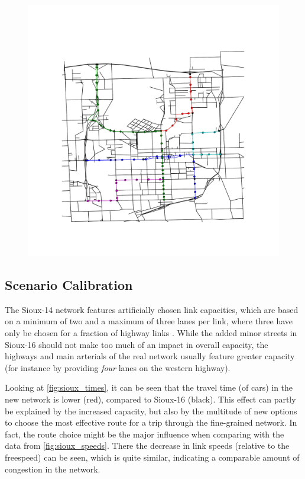 \begin{figure}
    \centering
    \includegraphics[width=1.0\textwidth]{figures/pt_network.pdf}
    \caption{}
    \label{fig:pt_network}
\end{figure}

\subsection{Scenario Calibration}

The Sioux-14 network features artificially chosen link capacities, which are based
on a minimum of two and a maximum of three lanes per link, where three have only
be chosen for a fraction of highway links \citep{Chakirov2014}. While the added
minor streets in Sioux-16 should not make too much of an impact in overall
capacity, the highways and main arterials of the real network usually feature
greater capacity (for instance by providing \textit{four} lanes on the western highway).

Looking at \cref{fig:sioux_times}, it can be seen that the travel time (of cars) in
the new network is lower (red), compared to Sioux-16 (black). This effect can partly
be explained by the increased capacity, but also by the multitude of new options
to choose the most effective route for a trip through the fine-grained network. In
fact, the route choice might be the major influence when comparing with the data
from \cref{fig:sioux_speeds}. There the decrease in link speeds (relative to the freespeed) can be seen, which
is quite similar, indicating a comparable amount of congestion in the network.


